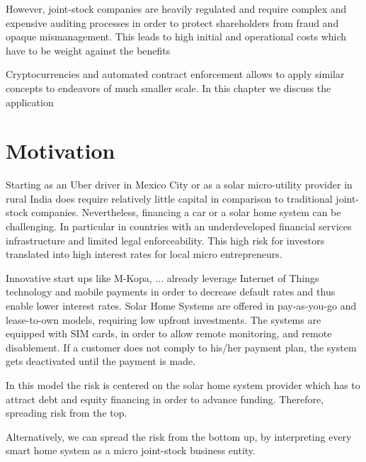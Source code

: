 However, joint-stock companies are heavily regulated and require complex and expensive auditing processes in order to protect shareholders from fraud and opaque mismanagement. This leads to high initial and operational costs which have to be weight against the benefits

Cryptocurrencies and automated contract enforcement allows to apply similar concepts to endeavors of much smaller scale. In this chapter we discuss the application 

\section{Motivation}

Starting as an Uber driver in Mexico City or as a solar micro-utility provider in rural India does require relatively little capital in comparison to traditional joint-stock companies. 
Nevertheless, financing a car or a solar home system can be challenging. In particular in countries with an underdeveloped financial services infrastructure and limited legal enforceability. This high risk for investors translated into high interest rates for local micro entrepreneurs. 

Innovative start ups like M-Kopa, ... already leverage Internet of Things technology and mobile payments in order to decrease default rates and thus enable lower interest rates. Solar Home Systems are offered in pay-as-you-go and lease-to-own models, requiring low upfront investments. The systems are equipped with SIM cards, in order to allow remote monitoring, and remote disablement. If a customer does not comply to his/her payment plan, the system gets deactivated until the payment is made. 

In this model the risk is centered on the solar home system provider which has to attract debt and equity financing in order to advance funding. Therefore, spreading risk from the top.

Alternatively, we can spread the risk from the bottom up, by interpreting every smart home system as a micro joint-stock business entity.



 



